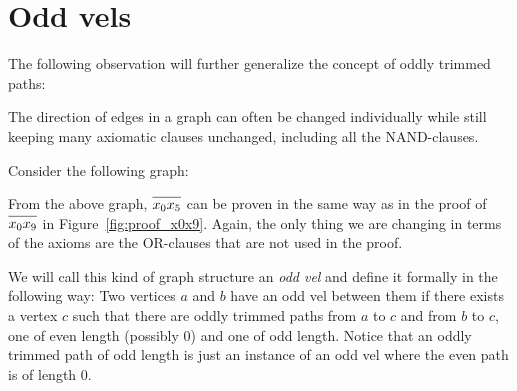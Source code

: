 

\section{Odd vels}
\label{sec:Odd vels}
The following observation will further generalize the concept of oddly trimmed paths:

The direction of edges in a graph can often be changed individually while still keeping many axiomatic clauses unchanged, including all the NAND-clauses.

Consider the following graph:\par
\begin{figure}[!h]
  \centering
  \caption{}
  \label{fig:vel-example}
\end{figure}
\FloatBarrier
From the above graph, $\ol{x_0x_5}$ can be proven in the same way as in the proof of $\ol{x_0x_9}$ in Figure~\ref{fig:proof_x0x9}.
Again, the only thing we are changing in terms of the axioms are the OR-clauses that are not used in the proof.

We will call this kind of graph structure an \textit{odd vel} and define it formally in the following way:
Two vertices $a$ and $b$ have an odd vel between them if there exists a vertex $c$ such that there are oddly trimmed paths from $a$ to $c$ and from $b$ to $c$, one of even length (possibly 0) and one of odd length.
Notice that an oddly trimmed path of odd length is just an instance of an odd vel where the even path is of length 0.

